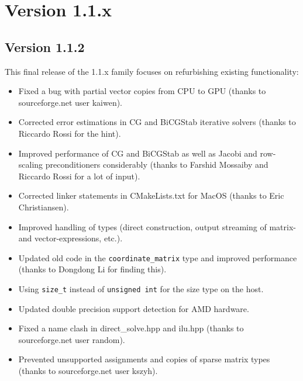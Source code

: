 \section*{Version 1.1.x}

\subsection*{Version 1.1.2}
This final release of the {\ViennaCL} 1.1.x family focuses on refurbishing existing functionality:
\begin{itemize}
 \item Fixed a bug with partial vector copies from CPU to GPU (thanks to sourceforge.net user kaiwen).
 \item Corrected error estimations in CG and BiCGStab iterative solvers (thanks to Riccardo Rossi for the hint).
 \item Improved performance of CG and BiCGStab as well as Jacobi and row-scaling preconditioners considerably (thanks to Farshid Mossaiby and Riccardo Rossi for a lot of input).
 \item Corrected linker statements in CMakeLists.txt for MacOS (thanks to Eric Christiansen).
 \item Improved handling of {\ViennaCL} types (direct construction, output streaming of matrix- and vector-expressions, etc.).
 \item Updated old code in the \texttt{coordinate\_matrix} type and improved performance (thanks to Dongdong Li for finding this).
 \item Using \lstinline|size_t| instead of \lstinline|unsigned int| for the size type on the host.
 \item Updated double precision support detection for AMD hardware.
 \item Fixed a name clash in direct\_solve.hpp and ilu.hpp (thanks to sourceforge.net user random).
 \item Prevented unsupported assignments and copies of sparse matrix types (thanks to sourceforge.net user kszyh).
\end{itemize}

